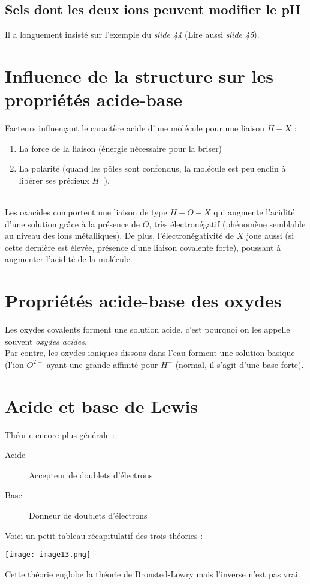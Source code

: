 \documentclass[british,french,11pt, a4paper, openany]{book}
\begin{document}
\subsection{Sels dont les deux ions peuvent modifier le pH}
Il a longuement insisté sur l'exemple du \textit{slide 44} (Lire aussi \textit{slide 45}).

\section{Influence de la structure sur les propriétés acide-base}
Facteurs influençant le caractère acide d'une molécule pour une liaison $H-X$ : 
\begin{enumerate}
	\item La force de la liaison (énergie nécessaire pour la briser)
	\item La polarité (quand les pôles sont confondus, la molécule est peu enclin à libérer ses précieux $H^+$).
\end{enumerate}
\ \\
Les oxacides comportent une liaison de type $H-O-X$ qui augmente l'acidité d'une solution grâce à la présence de $O$, très électronégatif (phénomène semblable au niveau des ions métalliques). De plus, l'électronégativité de $X$ joue aussi (si cette dernière est élevée, présence d'une liaison covalente forte), poussant à augmenter l'acidité de la molécule.

\section{Propriétés acide-base des oxydes}
Les oxydes covalents forment une solution acide, c'est pourquoi on les appelle souvent \textit{oxydes acides}.\\
Par contre, les oxydes ioniques dissous dans l'eau forment une solution basique (l'ion $O^{2-}$ ayant une grande affinité pour $H^+$ (normal, il s'agit d'une base forte). 

\section{Acide et base de Lewis}
Théorie encore plus générale :
\begin{description}
	\item[Acide] Accepteur de doublets d'électrons
	\item[Base] Donneur de doublets d'électrons
\end{description}
Voici un petit tableau récapitulatif des trois théories : 
\begin{center}
	\texttt{[image: image13.png]}\\
\end{center}
Cette théorie englobe la théorie de Bronsted-Lowry mais l'inverse n'est pas vrai.
\end{document}

